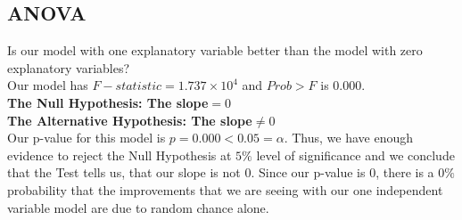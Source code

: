 \documentclass[10pt]{article}
\begin{document}
\subsection*{ANOVA}
Is our model with one explanatory variable better than the model with zero explanatory variables?\\
Our model has \(F-statistic = 1.737\times 10^4\)  and \(Prob > F\) is \(0.000\).\\
\textbf{The Null Hypothesis:   The slope\(=0\)\\
The Alternative Hypothesis: The slope\(\ne 0\)\\
}
Our p-value for this model is \(p=0.000 < 0.05 = \alpha\). Thus, we have enough evidence to reject the Null Hypothesis at \(5\%\) level of significance and we conclude that the Test  tells us, that our slope is not \(0\). Since our p-value is \(0\), there is a \(0\%\) probability that the improvements that we are seeing with our one independent variable model are due to random chance alone.
\end{document}
